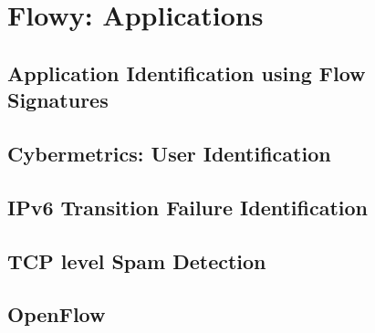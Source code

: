 \chapter{Flowy: Applications}\label{ch:flowy-applications}

\section{Application Identification using Flow 
Signatures}\label{sec:application-signatures}
\section{Cybermetrics: User Identification}\label{sec:cybermetrics}
\section{IPv6 Transition Failure Identification}\label{sec:ipv6transeval}
\section{TCP level Spam Detection}\label{sec:spam-detection}
\section{OpenFlow}\label{sec:openflow}
